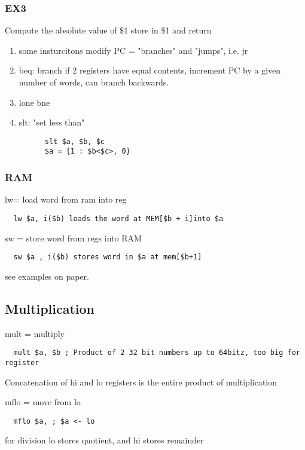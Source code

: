 \documentclass[11pt]{amsart}
\begin{document}
\subsubsection{EX3}
\par Compute the absolute value of \$1 store in \$1 and return
\begin{enumerate}
  \item some insturcitons modify PC =  "branches" and "jumps", i.e. jr
  \item beq: branch if 2 registers have equal contents, increment PC by a given
    number of words, can branch backwards.
  \item lone bne
  \item slt: "set less than"
    \begin{verbatim}
      slt $a, $b, $c
      $a = {1 : $b<$c>, 0}
    \end{verbatim}

\end{enumerate}

\subsubsection{RAM}
\par lw= load word from ram into reg
\begin{verbatim}
  lw $a, i($b) loads the word at MEM[$b + i]into $a
\end{verbatim}

\par sw = store word from regs into RAM
\begin{verbatim}
  sw $a , i($b) stores word in $a at mem[$b+1]
\end{verbatim}
\par see examples on paper.
\subsection{Multiplication}
\par mult =  multiply
\begin{verbatim}
  mult $a, $b ; Product of 2 32 bit numbers up to 64bitz, too big for register
\end{verbatim}
\par Concatenation of hi and lo registers is the entire product of
multiplication
\par mflo = move from lo
\begin{verbatim}
  mflo $a, ; $a <- lo
\end{verbatim}
\par for division lo stores quotient, and hi stores remainder
\end{document}
